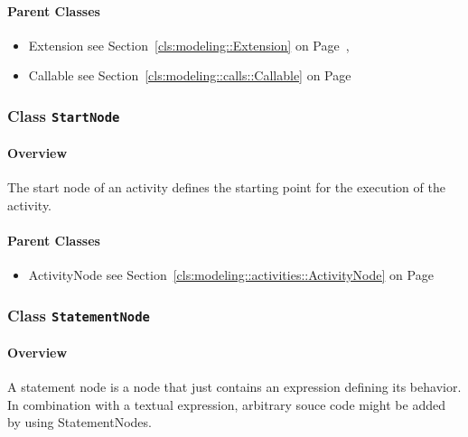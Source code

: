 	



\paragraph{Parent Classes}
\begin{itemize}
\item Extension see Section~\ref{cls:modeling::Extension} on Page~\pageref{cls:modeling::Extension}, \item Callable see Section~\ref{cls:modeling::calls::Callable} on Page~\pageref{cls:modeling::calls::Callable}\end{itemize}
\subsubsection{\Large{Class \bfseries \texttt{StartNode}\normalfont}}
\label{cls:modeling::activities::StartNode} 
\paragraph{Overview}

	
			
The start node of an activity defines the starting point for the execution of the activity.	
		
	



\paragraph{Parent Classes}
\begin{itemize}
\item ActivityNode see Section~\ref{cls:modeling::activities::ActivityNode} on Page~\pageref{cls:modeling::activities::ActivityNode}\end{itemize}
\subsubsection{\Large{Class \bfseries \texttt{StatementNode}\normalfont}}
\label{cls:modeling::activities::StatementNode} 
\paragraph{Overview}

	
			
A statement node is a node that just contains an expression defining its behavior. In combination with a textual expression, arbitrary souce code might be added by using StatementNodes.	
		
